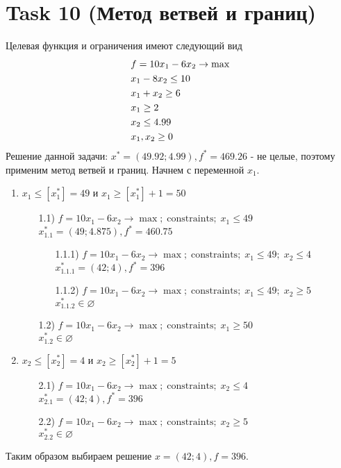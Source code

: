 \documentclass[12pt]{article}
\begin{document}
\section*{Task 10 (Метод ветвей и границ)}
Целевая функция и ограничения имеют следующий вид
\begin{align}
  &f = 10x_1-6x_2\to\max\notag\\
  &x_1-8x_2\leq10\notag\\
  &x_1+x_2\geq6\\
  &x_1\geq2\notag\\
  &x_2\leq4.99\notag\\
  &x_1,x_2\geq0\notag
\end{align}
Решение данной задачи: $x^*=(49.92;4.99), f^*=469.26$ - не целые, поэтому применим метод ветвей и границ.
Начнем с переменной $x_1$.
\begin{enumerate}
  \item $x_1\leqslant [x_1^*]=49$ и $x_1\geqslant [x_1^*]+1=50$
    \begin{enumerate}
      \item[1.1)] $f = 10x_1-6x_2\to\max; \;\text{constraints};\; x_1\leqslant 49$\\
      $x_{1.1}^*=(49;4.875), f^*=460.75$\\
      \begin{enumerate}
        \item[1.1.1)]  $f = 10x_1-6x_2\to\max;\; \text{constraints};\; x_1\leqslant 49;\; x_2\leqslant 4$\\
        $x_{1.1.1}^*=(42;4), f^*=396$\\
        \item[1.1.2)]  $f = 10x_1-6x_2\to\max;\; \text{constraints};\; x_1\leqslant 49;\; x_2\geqslant 5$\\
        $x_{1.1.2}^*\in\varnothing$\\
      \end{enumerate}
      \item[1.2)] $f = 10x_1-6x_2\to\max; \;\text{constraints};\; x_1\geqslant 50$\\
      $x_{1.2}^*\in\varnothing$\\

    \end{enumerate}
  \item $x_2\leqslant [x_2^*]=4$ и $x_2\geqslant [x_2^*]+1=5$
  \begin{enumerate}
    \item[2.1)] $f = 10x_1-6x_2\to\max; \;\text{constraints};\; x_2\leqslant 4$\\
    $x_{2.1}^*=(42;4), f^*=396$\\
    \item[2.2)] $f = 10x_1-6x_2\to\max; \;\text{constraints};\; x_2\geqslant 5$\\
    $x_{2.2}^*\in\varnothing$
  \end{enumerate}
\end{enumerate}
Таким образом выбираем решение $x=(42; 4), f=396$.
\end{document}

